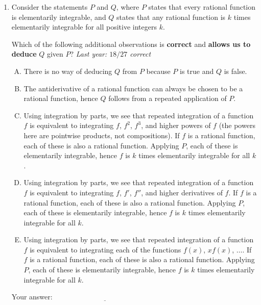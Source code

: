 \documentclass[10pt]{amsart}
\begin{document}
\begin{enumerate}

\item Consider the statements $P$ and $Q$, where $P$ states that every
  rational function is elementarily integrable, and $Q$ states that
  any rational function is $k$ times elementarily integrable for all
  positive integers $k$.

  Which of the following additional observations is {\bf correct} and
  {\bf allows us to deduce} $Q$ given $P$? {\em Last year: $18/27$ correct}

  \begin{enumerate}[(A)]
  \item There is no way of deducing $Q$ from $P$ because $P$ is true
    and $Q$ is false.
  \item The antiderivative of a rational function can always be chosen
    to be a rational function, hence $Q$ follows from a repeated
    application of $P$.
  \item Using integration by parts, we see that repeated integration
    of a function $f$ is equivalent to integrating $f$, $f^2$, $f^3$,
    and higher powers of $f$ (the powers here are pointwise products,
    not compositions). If $f$ is a rational function, each of these is
    also a rational function. Applying $P$, each of these is
    elementarily integrable, hence $f$ is $k$ times elementarily
    integrable for all $k$.
  \item Using integration by parts, we see that repeated integration
    of a function $f$ is equivalent to integrating $f$, $f'$, $f''$,
    and higher derivatives of $f$. If $f$ is a rational function, each
    of these is also a rational function. Applying $P$, each of these
    is elementarily integrable, hence $f$ is $k$ times elementarily
    integrable for all $k$.
  \item Using integration by parts, we see that repeated integration
    of a function $f$ is equivalent to integrating each of the
    functions $f(x)$, $xf(x)$, $\dots$. If $f$ is a rational function,
    each of these is also a rational function. Applying $P$, each of
    these is elementarily integrable, hence $f$ is $k$ times
    elementarily integrable for all $k$.
  \end{enumerate}

  \vspace{0.1in}
  Your answer: $\underline{\qquad\qquad\qquad\qquad\qquad\qquad\qquad}$
  \vspace{0.6in}


\end{enumerate}
\end{document}
